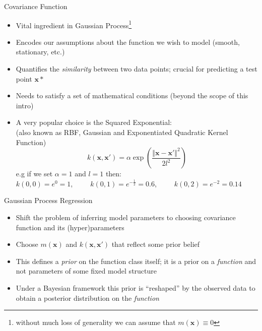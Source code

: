 \documentclass[pdf]{beamer}
\begin{document}
\begin{frame}{Covariance Function}
\begin{itemize}\addtolength{\itemsep}{0.2\baselineskip}
	\item<1-> Vital ingredient in Gaussian Process\footnote{without much loss of generality we can assume that $m(\mathbf{x}) \equiv 0$} 
	\item<2-> Encodes our assumptions about the function we wish to model (smooth, stationary, etc.)
	\item<3-> Quantifies the \textit{similarity} between two data points; crucial for predicting a test point $\mathbf{x*}$
	\item<4-> Needs to satisfy a set of mathematical conditions {\tiny (beyond the scope of this intro)}
	\item<5-> A very popular choice is the Squared Exponential:\\ 
	{\tiny (also known as RBF, Gaussian and Exponentiated Quadratic Kernel Function)} 
	$$
	k(\mathbf{x},\mathbf{x}') = \alpha \exp \left( {\frac{\Vert \mathbf{x} - \mathbf{x'} \Vert^2}{2l^2}} \right)
	$$
	e.g if we set $\alpha=1$ and $l=1$ then:\\
 	{\footnotesize $k(0, 0) = e^0 = 1$,\ \ \ \ \ $k(0, 1) = e^{-\frac{1}{2}} = 0.6$,\ \ \ \ \ $k(0, 2) = e^{-2} = 0.14$}
\end{itemize}
\end{frame}

\begin{frame}{Gaussian Process Regression}
\begin{itemize}\addtolength{\itemsep}{1\baselineskip}
	\item<1-> Shift the problem of inferring model parameters to choosing covariance function and its (hyper)parameters
	\item<2-> Choose $m(\mathbf{x})$ and $k(\mathbf{x},\mathbf{x}')$ that reflect some prior belief
	\item<3-> This defines a \textit{prior} on the function class itself; it is a prior on a \textit{function} and not 
	parameters of some fixed model structure
	\item<4-> Under a Bayesian framework this prior is ``reshaped'' by the observed data to obtain a posterior distribution
	on the \textit{function}
\end{itemize}
\end{frame}
\end{document}
